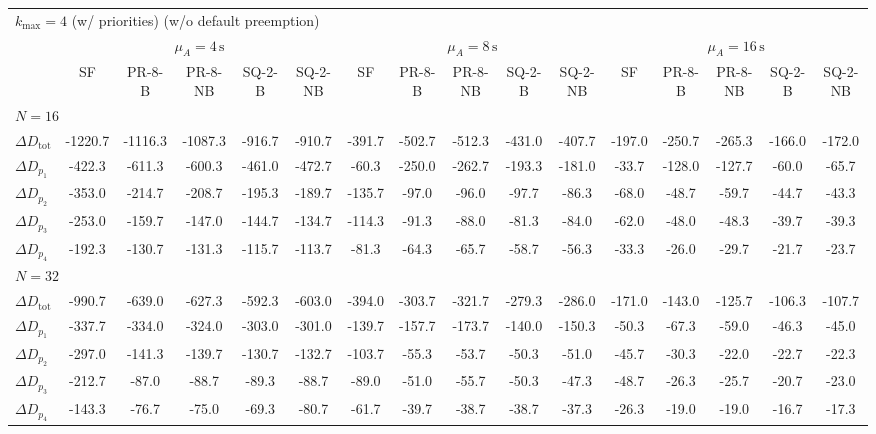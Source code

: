 \begin{tabular}{l c c c c c c c c c c c c c c c}
\toprule
\multicolumn{16}{l}{$k_{\max}=4$ (w/ priorities) (w/o default preemption)} \\
\addlinespace[0.2em]
 & \multicolumn{5}{c}{$\mu_A=4\,\mathrm{s}$} & \multicolumn{5}{c}{$\mu_A=8\,\mathrm{s}$} & \multicolumn{5}{c}{$\mu_A=16\,\mathrm{s}$} \\
\cmidrule(lr){2-6}\cmidrule(lr){7-11}\cmidrule(lr){12-16}
 & SF & PR-8-B & PR-8-NB & SQ-2-B & SQ-2-NB & SF & PR-8-B & PR-8-NB & SQ-2-B & SQ-2-NB & SF & PR-8-B & PR-8-NB & SQ-2-B & SQ-2-NB \\
\midrule
\multicolumn{16}{l}{${N=16}$} \\
\midrule
$\Delta D_{\mathrm{tot}}$ & -1220.7 & -1116.3 & -1087.3 & -916.7 & -910.7 & -391.7 & -502.7 & -512.3 & -431.0 & -407.7 & -197.0 & -250.7 & -265.3 & -166.0 & -172.0 \\
$\Delta D_{p_1}$ & -422.3 & -611.3 & -600.3 & -461.0 & -472.7 & -60.3 & -250.0 & -262.7 & -193.3 & -181.0 & -33.7 & -128.0 & -127.7 & -60.0 & -65.7 \\
$\Delta D_{p_2}$ & -353.0 & -214.7 & -208.7 & -195.3 & -189.7 & -135.7 & -97.0 & -96.0 & -97.7 & -86.3 & -68.0 & -48.7 & -59.7 & -44.7 & -43.3 \\
$\Delta D_{p_3}$ & -253.0 & -159.7 & -147.0 & -144.7 & -134.7 & -114.3 & -91.3 & -88.0 & -81.3 & -84.0 & -62.0 & -48.0 & -48.3 & -39.7 & -39.3 \\
$\Delta D_{p_4}$ & -192.3 & -130.7 & -131.3 & -115.7 & -113.7 & -81.3 & -64.3 & -65.7 & -58.7 & -56.3 & -33.3 & -26.0 & -29.7 & -21.7 & -23.7 \\
\midrule
\multicolumn{16}{l}{${N=32}$} \\
\midrule
$\Delta D_{\mathrm{tot}}$ & -990.7 & -639.0 & -627.3 & -592.3 & -603.0 & -394.0 & -303.7 & -321.7 & -279.3 & -286.0 & -171.0 & -143.0 & -125.7 & -106.3 & -107.7 \\
$\Delta D_{p_1}$ & -337.7 & -334.0 & -324.0 & -303.0 & -301.0 & -139.7 & -157.7 & -173.7 & -140.0 & -150.3 & -50.3 & -67.3 & -59.0 & -46.3 & -45.0 \\
$\Delta D_{p_2}$ & -297.0 & -141.3 & -139.7 & -130.7 & -132.7 & -103.7 & -55.3 & -53.7 & -50.3 & -51.0 & -45.7 & -30.3 & -22.0 & -22.7 & -22.3 \\
$\Delta D_{p_3}$ & -212.7 & -87.0 & -88.7 & -89.3 & -88.7 & -89.0 & -51.0 & -55.7 & -50.3 & -47.3 & -48.7 & -26.3 & -25.7 & -20.7 & -23.0 \\
$\Delta D_{p_4}$ & -143.3 & -76.7 & -75.0 & -69.3 & -80.7 & -61.7 & -39.7 & -38.7 & -38.7 & -37.3 & -26.3 & -19.0 & -19.0 & -16.7 & -17.3 \\
\bottomrule
\end{tabular}
